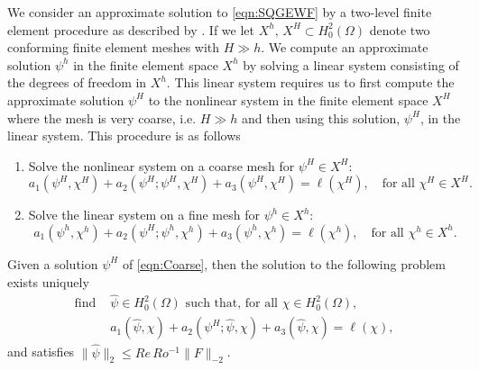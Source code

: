 We consider an approximate solution to \eqref{eqn:SQGEWF} by a two-level finite element procedure
as described by \cite{Fairag98,Layton93}. If we let $X^h,\, X^H \subset H^2_0(\Omega)$ denote two
conforming finite element meshes with $H \gg h$. We compute an approximate solution $\psi^h$ in the
finite element space $X^h$ by solving a linear system consisting of the degrees of freedom in $X^h$.
This linear system requires us to first compute the approximate solution $\psi^H$ to the nonlinear
system in the finite element space $X^H$ where the mesh is very coarse, i.e. $H \gg h$ and then
using this solution, $\psi^H$, in the linear system. This procedure is as follows

\begin{algorithm}[H]
  \caption{}%
  \label{alg:TwoLevel}
  \begin{enumerate}[Step 1:]
    \item Solve the nonlinear system on a coarse mesh for $\psi^H\in X^H$:
    \begin{equation}
      a_1(\psi^H,\chi^H) + a_2(\psi^H; \psi^H,\chi^H) + a_3(\psi^H,\chi^H) = \ell(\chi^H), \quad \text{for all }
        \chi^H \in X^H.
      \label{eqn:Coarse}
    \end{equation}
    \item Solve the linear system on a fine mesh for $\psi^h\in X^h$:
    \begin{equation}
      a_1(\psi^h,\chi^h) + a_2(\psi^H; \psi^h,\chi^h) + a_3(\psi^h,\chi^h) = \ell(\chi^h), \quad \text{for all }
        \chi^h \in X^h.
      \label{eqn:Fine}
    \end{equation}
  \end{enumerate}
\end{algorithm}
\begin{lemma}\label{lma:Fine}
  Given a solution $\psi^H$ of \eqref{eqn:Coarse}, then the solution to the following problem exists uniquely
    \begin{equation}
      \begin{split}
        \text{find } &\hat{\psi} \in H^2_0(\Omega) \text{ such that, for all } \chi\in H^2_0(\Omega), \\
        &a_1(\hat{\psi}, \chi) + a_2(\psi^H; \hat{\psi}, \chi) + a_3(\hat{\psi},\chi) = \ell(\chi),
      \end{split}
      \label{eqn:FineProb}
    \end{equation}
    and satisfies $\|\hat{\psi}\|_2 \le Re\, Ro^{-1} \|F\|_{-2}$.
\end{lemma}
